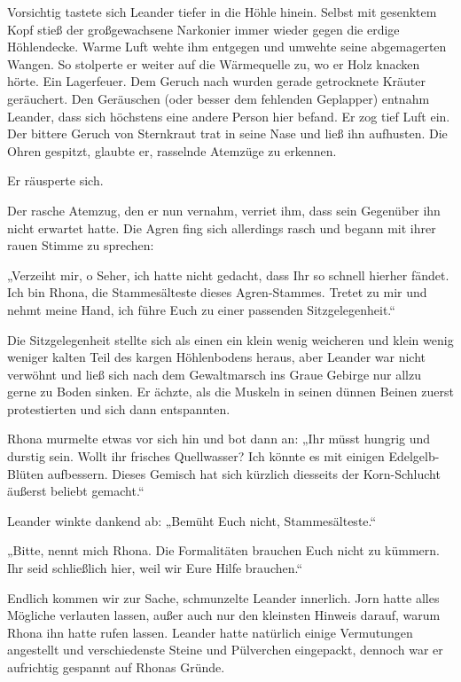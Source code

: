 Vorsichtig tastete sich Leander tiefer in die Höhle hinein. Selbst mit gesenktem Kopf stieß der großgewachsene Narkonier immer wieder gegen die erdige Höhlendecke. Warme Luft wehte ihm entgegen und umwehte seine abgemagerten Wangen. So stolperte er weiter auf die Wärmequelle zu, wo er Holz knacken hörte. Ein Lagerfeuer. Dem Geruch nach wurden gerade getrocknete Kräuter geräuchert. Den Geräuschen (oder besser dem fehlenden Geplapper) entnahm Leander, dass sich höchstens eine andere Person hier befand. Er zog tief Luft ein. Der bittere Geruch von Sternkraut trat in seine Nase und ließ ihn aufhusten. Die Ohren gespitzt, glaubte er, rasselnde Atemzüge zu erkennen.

Er räusperte sich.

Der rasche Atemzug, den er nun vernahm, verriet ihm, dass sein Gegenüber ihn nicht erwartet hatte. Die Agren fing sich allerdings rasch und begann mit ihrer rauen Stimme zu sprechen:

„Verzeiht mir, o Seher, ich hatte nicht gedacht, dass Ihr so schnell hierher fändet. Ich bin Rhona, die Stammesälteste dieses Agren-Stammes. Tretet zu mir und nehmt meine Hand, ich führe Euch zu einer passenden Sitzgelegenheit.“

Die Sitzgelegenheit stellte sich als einen ein klein wenig weicheren und klein wenig weniger kalten Teil des kargen Höhlenbodens heraus, aber Leander war nicht verwöhnt und ließ sich nach dem Gewaltmarsch ins Graue Gebirge nur allzu gerne zu Boden sinken. Er ächzte, als die Muskeln in seinen dünnen Beinen zuerst protestierten und sich dann entspannten.

Rhona murmelte etwas vor sich hin und bot dann an: „Ihr müsst hungrig und durstig sein. Wollt ihr frisches Quellwasser? Ich könnte es mit einigen Edelgelb-Blüten aufbessern. Dieses Gemisch hat sich kürzlich diesseits der Korn-Schlucht äußerst beliebt gemacht.“

Leander winkte dankend ab: „Bemüht Euch nicht, Stammesälteste.“

„Bitte, nennt mich Rhona. Die Formalitäten brauchen Euch nicht zu kümmern. Ihr seid schließlich hier, weil wir Eure Hilfe brauchen.“

Endlich kommen wir zur Sache, schmunzelte Leander innerlich. Jorn hatte alles Mögliche verlauten lassen, außer auch nur den kleinsten Hinweis darauf, warum Rhona ihn hatte rufen lassen. Leander hatte natürlich einige Vermutungen angestellt und verschiedenste Steine und Pülverchen eingepackt, dennoch war er aufrichtig gespannt auf Rhonas Gründe.

